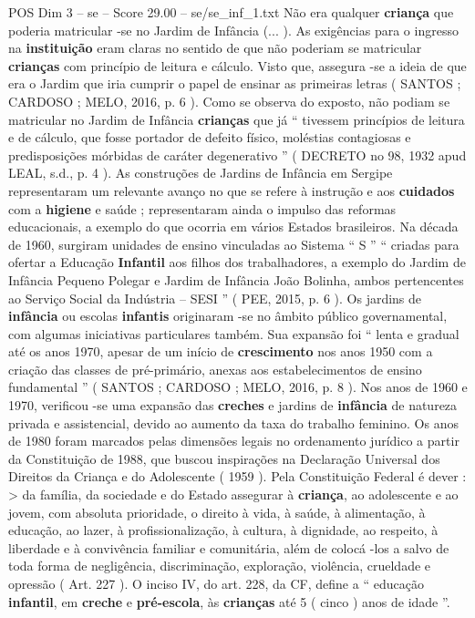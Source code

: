 \begin{textsample}{POS Dim 3 – se – Score 29.00 – se/se\_inf\_1.txt}
Não era qualquer \textbf{criança} que poderia matricular -se no Jardim de Infância (... ).
As exigências para o ingresso na \textbf{instituição} eram claras no sentido de que não poderiam se matricular \textbf{crianças} com princípio de leitura e cálculo.
Visto que, assegura -se a ideia de que era o Jardim que iria cumprir o papel de ensinar as primeiras letras ( SANTOS ; CARDOSO ; MELO, 2016, p. 6 ).
Como se observa do exposto, não podiam se matricular no Jardim de Infância \textbf{crianças} que já “ tivessem princípios de leitura e de cálculo, que fosse portador de defeito físico, moléstias contagiosas e predisposições mórbidas de caráter degenerativo ” ( DECRETO no 98, 1932 apud LEAL, s.d., p. 4 ).
As construções de Jardins de Infância em Sergipe representaram um relevante avanço no que se refere à instrução e aos \textbf{cuidados} com a \textbf{higiene} e saúde ; representaram ainda o impulso das reformas educacionais, a exemplo do que ocorria em vários Estados brasileiros.
Na década de 1960, surgiram unidades de ensino vinculadas ao Sistema “ S ” “ criadas para ofertar a Educação \textbf{Infantil} aos filhos dos trabalhadores, a exemplo do Jardim de Infância Pequeno Polegar e Jardim de Infância João Bolinha, ambos pertencentes ao Serviço Social da Indústria – SESI ” ( PEE, 2015, p. 6 ).
Os jardins de \textbf{infância} ou escolas \textbf{infantis} originaram -se no âmbito público governamental, com algumas iniciativas particulares também.
Sua expansão foi “ lenta e gradual até os anos 1970, apesar de um início de \textbf{crescimento} nos anos 1950 com a criação das classes de pré-primário, anexas aos estabelecimentos de ensino fundamental ” ( SANTOS ; CARDOSO ; MELO, 2016, p. 8 ).
Nos anos de 1960 e 1970, verificou -se uma expansão das \textbf{creches} e jardins de \textbf{infância} de natureza privada e assistencial, devido ao aumento da taxa do trabalho feminino.
Os anos de 1980 foram marcados pelas dimensões legais no ordenamento jurídico a partir da Constituição de 1988, que buscou inspirações na Declaração Universal dos Direitos da Criança e do Adolescente ( 1959 ).
Pela Constituição Federal é dever : > da família, da sociedade e do Estado assegurar à \textbf{criança}, ao adolescente e ao jovem, com absoluta prioridade, o direito à vida, à saúde, à alimentação, à educação, ao lazer, à profissionalização, à cultura, à dignidade, ao respeito, à liberdade e à convivência familiar e comunitária, além de colocá -los a salvo de toda forma de negligência, discriminação, exploração, violência, crueldade e opressão ( Art. 227 ).
O inciso IV, do art. 228, da CF, define a “ educação \textbf{infantil}, em \textbf{creche} e \textbf{pré-escola}, às \textbf{crianças} até 5 ( cinco ) anos de idade ”.

\end{textsample}
